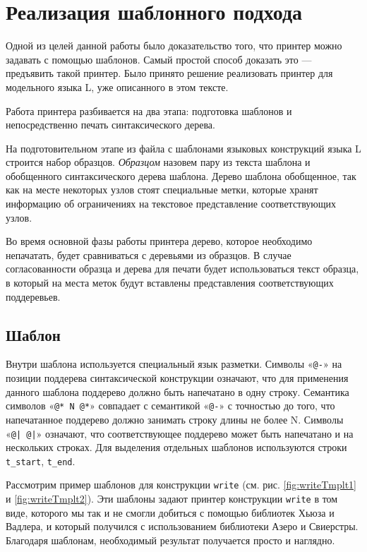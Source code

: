 \section{Реализация шаблонного подхода}

Одной из целей данной работы было доказательство того, что принтер можно задавать с помощью шаблонов.
Самый простой способ доказать это --- предъявить такой принтер. Было принято решение реализовать принтер для модельного языка L, уже описанного в этом тексте.

Работа принтера разбивается на два этапа: подготовка шаблонов и непосредственно печать синтаксического дерева.

На подготовительном этапе из файла с шаблонами языковых конструкций языка L строится набор образцов. \textit{Образцом} назовем пару из текста шаблона и обобщенного синтаксического дерева шаблона. Дерево шаблона обобщенное, так как на месте некоторых узлов стоят специальные метки, которые хранят информацию об ограничениях на текстовое представление соответствующих узлов.

Во время основной фазы работы принтера дерево, которое необходимо непачатать, будет сравниваться с деревьями из образцов. В случае согласованности образца и дерева для печати будет использоваться текст образца, в который на места меток будут вставлены представления соответствующих поддеревьев.

\subsection{Шаблон}

Внутри шаблона используется специальный язык разметки. Символы «\lstinline{@-}» на позиции поддерева синтаксической конструкции означают, что для применения данного шаблона поддерево должно быть напечатано в одну строку. Семантика символов «\lstinline{@* N @*}» совпадает с семантикой «\lstinline{@-}» с точностью до того, что напечатанное поддерево должно занимать строку длины не более N. Символы «\lstinline{@| @|}» означают, что соответствующее поддерево может быть напечатано и на нескольких строках. Для выделения отдельных шаблонов используются строки \lstinline{t_start}, \lstinline{t_end}.

Рассмотрим пример шаблонов для конструкции \lstinline{write} (см. рис. \ref{fig:writeTmplt1} и \ref{fig:writeTmplt2}). Эти шаблоны задают принтер конструкции \lstinline{write} в том виде, которого мы так и не смогли добиться с помощью библиотек Хьюза и Вадлера, и который получился с использованием библиотеки Азеро и Свиерстры. Благодаря шаблонам, необходимый результат получается просто и наглядно.

